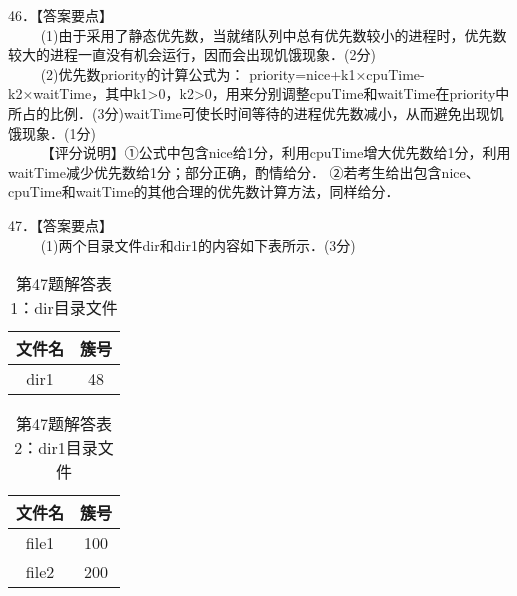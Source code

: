 46．【答案要点】 \\
$\qquad$ (1)由于采用了静态优先数，当就绪队列中总有优先数较小的进程时，优先数较大的进程一直没有机会运行，因而会出现饥饿现象．(2分) \\
$\qquad$ (2)优先数priority的计算公式为：
priority=nice+k1×cpuTime-k2×waitTime，其中k1>0，k2>0，用来分别调整cpuTime和waitTime在priority中所占的比例．(3分)waitTime可使长时间等待的进程优先数减小，从而避免出现饥饿现象．(1分) \\
$\qquad$ 【评分说明】①公式中包含nice给1分，利用cpuTime增大优先数给1分，利用waitTime减少优先数给1分；部分正确，酌情给分．
②若考生给出包含nice、cpuTime和waitTime的其他合理的优先数计算方法，同样给分．

47．【答案要点】 \\
$\qquad$ (1)两个目录文件dir和dir1的内容如下表所示．(3分)
\begin{table}[ht]
\centering
\caption{第47题解答表1：dir目录文件}\label{CSN16_tab6}
\begin{tabular}{|c|c|}
\hline
文件名 & 簇号 \\
\hline
dir1 & 48 \\
\hline
\end{tabular}
\end{table}

\begin{table}[ht]
\centering
\caption{第47题解答表2：dir1目录文件}\label{CSN16_tab7}
\begin{tabular}{|c|c|}
\hline
文件名 & 簇号 \\
\hline
file1 & 100 \\
\hline
file2 & 200 \\
\hline
\end{tabular}
\end{table}
